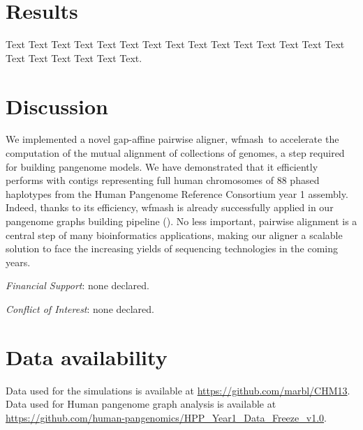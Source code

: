 \documentclass{bioinfo}
\newcommand{\wfmash}{wfmash}
\begin{document}
    \section{Results}

    Text Text Text Text Text Text Text Text Text Text Text Text Text
    Text Text Text Text Text Text Text Text.


    \section{Discussion}

    We implemented a novel gap-affine pairwise aligner, \wfmash\, to accelerate the computation of the mutual
    alignment of collections of genomes, a step required for building pangenome models. We have demonstrated that
    it efficiently performs with contigs representing full human chromosomes of 88 phased haplotypes from the
    Human Pangenome Reference Consortium year 1 assembly. Indeed, thanks to its efficiency, wfmash is already
    successfully applied in our pangenome graphs building pipeline (\citep{pggb}). No less important, pairwise
    alignment is a central step of many bioinformatics applications, making our aligner a scalable solution to face the
    increasing yields of sequencing technologies in the coming years.

%
%

    \vspace*{+12pt}
    \textit{Financial Support}: none declared.

    \textit{Conflict of Interest}: none declared.
    \vspace*{+12pt}

    \section*{Data availability}

    Data used for the simulations is available at \href{https://github.com/marbl/CHM13}{https://github.com/marbl/CHM13}.
    Data used for Human pangenome graph analysis is available at \href{https://github.com/human-pangenomics/HPP_Year1_Data_Freeze_v1.0}{https://github.com/human-pangenomics/HPP\_Year1\_Data\_Freeze\_v1.0}.
\end{document}

